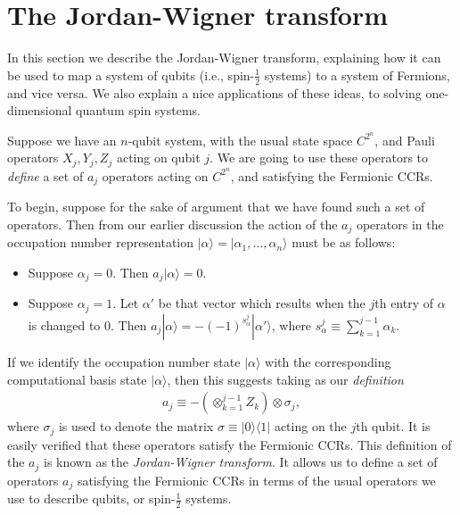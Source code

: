 \documentclass[12pt]{article}
\begin{document}
{\section{The Jordan-Wigner transform}

In this section we describe the Jordan-Wigner transform, explaining how
it can be used to map a system of qubits (i.e., spin-$\frac 12$
systems) to a system of Fermions, and vice versa.  We also explain a
nice applications of these ideas, to solving one-dimensional quantum
spin systems.

Suppose we have an $n$-qubit system, with the usual state space
$C^{2^n}$, and Pauli operators $X_j, Y_j,Z_j$ acting on qubit $j$.  We
are going to use these operators to \emph{define} a set of $a_j$
operators acting on $C^{2^n}$, and satisfying the Fermionic CCRs.

To begin, suppose for the sake of argument that we have found such a
set of operators.  Then from our earlier discussion the action of the
$a_j$ operators in the occupation number representation
$|\alpha\rangle = |\alpha_1,\ldots,\alpha_n\rangle$ must be as
follows:
\begin{itemize}
\item Suppose $\alpha_j = 0$.  Then $a_j|\alpha\rangle = 0$.
  
\item Suppose $\alpha_j = 1$.  Let $\alpha'$ be that vector which
  results when the $j$th entry of $\alpha$ is changed to $0$.  Then
  $a_j|\alpha\rangle = -(-1)^{s_\alpha^j} |\alpha'\rangle$, where
  $s_\alpha^j \equiv \sum_{k=1}^{j-1} \alpha_k$.
\end{itemize}
If we identify the occupation number state $|\alpha\rangle$ with the
corresponding computational basis state $|\alpha\rangle$, then this
suggests taking as our \emph{definition}
\begin{eqnarray}
  a_j \equiv -\left( \otimes_{k=1}^{j-1} Z_k \right) \otimes \sigma_j,
\end{eqnarray}
where $\sigma_j$ is used to denote the matrix $\sigma \equiv |0\rangle
\langle 1|$ acting on the $j$th qubit.  It is easily verified that
these operators satisfy the Fermionic CCRs.  This definition of the
$a_j$ is known as the \emph{Jordan-Wigner transform}.  It allows us to
define a set of operators $a_j$ satisfying the Fermionic CCRs in terms
of the usual operators we use to describe qubits, or spin-$\frac 12$
systems.

}
\end{document}
